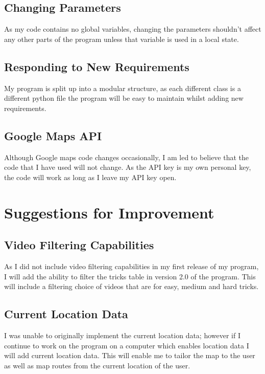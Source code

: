 	\subsection{Changing Parameters}

As my code contains no global variables, changing the parameters shouldn't affect any other parts of the program unless that variable is used in a local state. 

	\subsection{Responding to New Requirements}

My program is split up into a modular structure, as each different class is a different python file the program will be easy to maintain whilst adding new requirements. 

	\subsection{Google Maps API}

Although Google maps code changes occasionally, I am led to believe that the code that I have used will not change. As the API key is my own personal key, the code will work as long as I leave my API key open.

\section{Suggestions for Improvement} 



	\subsection{Video Filtering Capabilities}

As I did not include video filtering capabilities in my first release of my program, I will add the ability to filter the tricks table in version 2.0 of the program. This will include a filtering choice of videos that are for easy, medium and hard tricks.


	\subsection{Current Location Data}

I was unable to originally implement the current location data; however if I continue to work on the program on a computer which enables location data I will add current location data. This will enable me to tailor the map to the user as well as map routes from the current location of the user.

